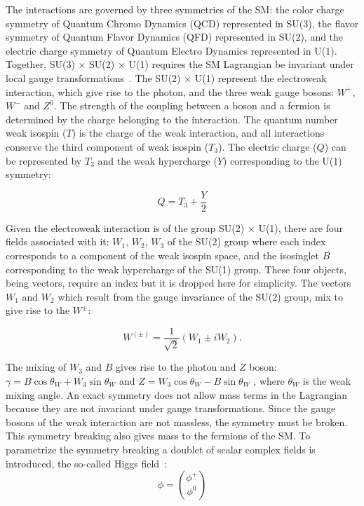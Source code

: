 The interactions are governed by three symmetries of the SM: the color charge 
symmetry of Quantum Chromo Dynamics (QCD) represented in SU(3), the flavor 
symmetry of Quantum Flavor Dynamics (QFD) represented in SU(2), and the electric 
charge symmetry of Quantum Electro Dynamics represented in U(1). Together, SU(3) 
$\times$  SU(2) $\times$ U(1) requires the SM Lagrangian be invariant under 
local gauge transformations~\cite{perkins2000introduction}. The SU(2) $\times$ U(1) represent the electroweak interaction, 
which give rise to the photon, and the three weak gauge bosons: $W^{+}$, $W^{-}$ and $Z^0$.
The strength of the coupling between a boson and a fermion is determined by the 
charge belonging to the interaction. The quantum number weak isospin ($T$) is the charge 
of the weak interaction, and all interactions conserve the third component of weak isospin ($T_{3}$).
The electric charge ($Q$) can be represented by $T_{3}$ and the weak hypercharge ($Y$) 
corresponding to the U(1) symmetry:

\begin{equation}
\label{eq:Q-charge}
Q = T_{3} + \frac{Y}{2}
\end{equation}

Given the electroweak interaction is of the group SU(2) $\times$ U(1), there are four fields associated 
with it: $W_{1}$, $W_{2}$, $W_{3}$ of the SU(2) group where each index
corresponds to a component of the weak isospin space, and the isosinglet $B$ corresponding
to the weak hypercharge of the SU(1) group. These four objects, being vectors, require an index but it 
is dropped here for simplicity. The vectors $W_{1}$ and $W_{2}$ which result from the 
gauge invariance of the SU(2) group, mix to give rise to the $W^{\pm}$:

\begin{equation}
\label{eq:vector-boson}
W^{\left(\pm\right)}= \frac{1}{\sqrt{2}}\left(W_{1} \pm iW_{2}\right).
\end{equation}

The mixing of $W_{3}$ and $B$ gives rise to the photon and $Z$ boson: 
$\gamma = B \cos \theta_W + W_{3} \sin \theta_W$  and $Z = W_{3}\cos \theta_W - B \sin \theta_W$ ,
where $\theta_W$ is the weak mixing angle. An exact symmetry does not allow mass 
terms in the Lagrangian because they are not invariant under gauge transformations.
Since the gauge bosons of the weak interaction are not massless, the symmetry must be broken.
This symmetry breaking also gives mass to the fermions of the SM. To parametrize the symmetry 
breaking a doublet of scalar complex fields is introduced, the so-called
Higgs field~\cite{PhysRevLett.13.508}:
\begin{equation}
\label{eq:higgs-field}
\phi = \binom{\phi^{+}}{\phi^{0}}
\end{equation}

